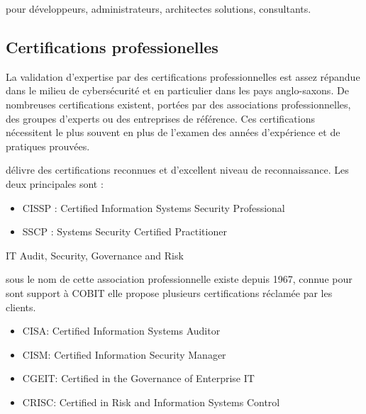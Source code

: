   

   pour  développeurs, administrateurs, architectes solutions, consultants.

\subsection{Certifications professionelles} 

La validation d'expertise par des certifications professionnelles est assez répandue dans le milieu de cybersécurité et en particulier dans les pays anglo-saxons. De nombreuses certifications existent, portées par des associations professionnelles, des groupes d'experts ou des entreprises de référence. Ces certifications nécessitent le plus souvent en plus de l'examen des années d'expérience et de pratiques prouvées.

   délivre des certifications reconnues et d'excellent niveau de reconnaissance.
Les deux principales sont :
\begin{itemize}
  \item CISSP : Certified Information Systems Security Professional
  \item SSCP : Systems Security Certified Practitioner
\end{itemize}


 IT Audit, Security, Governance and Risk 

sous le nom de  cette association professionnelle existe depuis 1967, connue pour sont support à COBIT elle propose plusieurs certifications réclamée par les clients. 


\begin{itemize}
  \item CISA: Certified Information Systems Auditor
  \item CISM: Certified Information Security Manager
 \item CGEIT: Certified in the Governance of Enterprise IT
  \item CRISC: Certified in Risk and Information Systems Control
\end{itemize}

